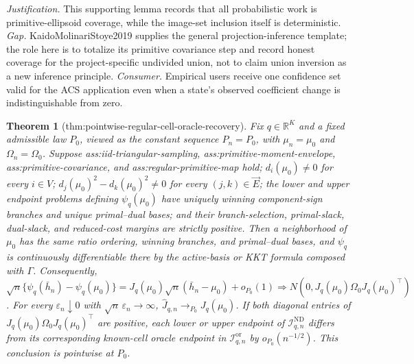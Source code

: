 \documentclass{article}
\newtheorem{theorem}{Theorem}
\begin{document}
\par\smallskip\noindent \textit{Justification.} This supporting lemma records that all probabilistic work is primitive-ellipsoid coverage, while the image-set inclusion itself is deterministic. \textit{Gap.} KaidoMolinariStoye2019 supplies the general projection-inference template; the role here is to totalize its primitive covariance step and record honest coverage for the project-specific undivided union, not to claim union inversion as a new inference principle. \textit{Consumer.} Empirical users receive one confidence set valid for the ACS application even when a state's observed coefficient change is indistinguishable from zero.

\begin{theorem}[thm:pointwise-regular-cell-oracle-recovery]\label{thm:pointwise-regular-cell-oracle-recovery}
Fix \(q\in\mathbb R^K\) and a fixed admissible law \(P_0\), viewed as the constant sequence \(P_n=P_0\), with \(\mu_n=\mu_0\) and \(\Omega_n=\Omega_0\). Suppose ass:iid-triangular-sampling, ass:primitive-moment-envelope, ass:primitive-covariance, and ass:regular-primitive-map hold; \(d_i(\mu_0)\ne0\) for every \(i\in V\); \(d_j(\mu_0)^2-d_k(\mu_0)^2\ne0\) for every \((j,k)\in\vec E\); the lower and upper endpoint problems defining \(\psi_q(\mu_0)\) have uniquely winning component-sign branches and unique primal--dual bases; and their branch-selection, primal-slack, dual-slack, and reduced-cost margins are strictly positive. Then a neighborhood of \(\mu_0\) has the same ratio ordering, winning branches, and primal--dual bases, and \(\psi_q\) is continuously differentiable there by the active-basis or KKT formula composed with \(\Gamma\). Consequently, \(\sqrt n\{\psi_q(\bar h_n)-\psi_q(\mu_0)\}=J_q(\mu_0)\sqrt n(\bar h_n-\mu_0)+o_{P_0}(1)\Rightarrow N(0,J_q(\mu_0)\Omega_0J_q(\mu_0)^\top)\). For every \(\varepsilon_n\downarrow0\) with \(\sqrt n\,\varepsilon_n\to\infty\), \(\widehat J_{q,n}\to_{P_0}J_q(\mu_0)\). If both diagonal entries of \(J_q(\mu_0)\Omega_0J_q(\mu_0)^\top\) are positive, each lower or upper endpoint of \(\mathcal I_{q,n}^{\mathrm{ND}}\) differs from its corresponding known-cell oracle endpoint in \(\mathcal I_{q,n}^{\mathrm{or}}\) by \(o_{P_0}(n^{-1/2})\). This conclusion is pointwise at \(P_0\).
\end{theorem}
\end{document}
